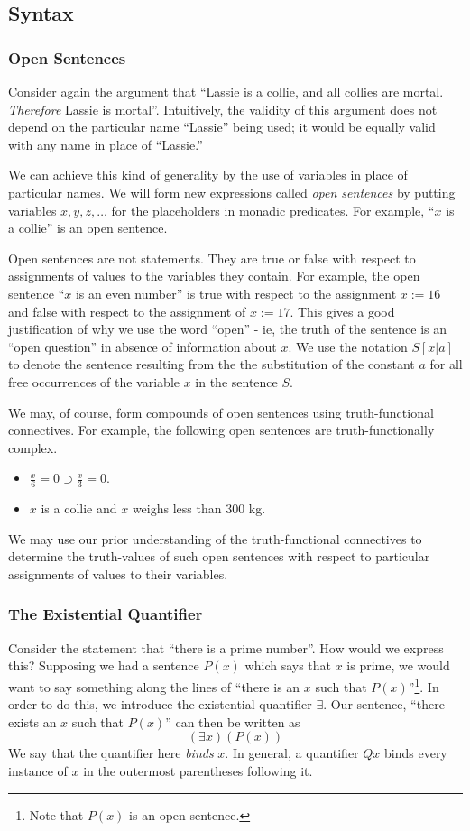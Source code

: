 \subsection{Syntax}

\subsubsection*{Open Sentences}
Consider again the argument that ``Lassie is a collie, and all collies are mortal. \emph{Therefore} Lassie is mortal''. Intuitively, the validity of this argument does not depend on the particular name ``Lassie'' being used; it would be equally valid with any name in place of ``Lassie.'' 

We can achieve this kind of generality by the use of variables in place of particular names. We will form new expressions called \emph{ open sentences} by putting variables $x,y,z,\dots$ for the placeholders in monadic predicates. For example, ``$x$ is a collie'' is an open sentence.

Open sentences are not statements. They are true or false with respect to assignments of values to the variables they contain. For example, the open sentence ``$x$ is an even number'' is true with respect to the assignment $x := 16$ and false with respect to the assignment of $x := 17$. This gives a good justification of why we use the word ``open'' - ie, the truth of the sentence is an ``open question'' in absence of information about $x$. We use the notation $S[x|a]$ to denote the sentence resulting from the the substitution of the constant $a$ for all free occurrences of the variable $x$ in the sentence $S$. 

We may, of course, form compounds of open sentences using truth-functional connectives. For example, the following open sentences are truth-functionally complex.
\begin{itemize}
\item $\frac{x}{6} = 0 \supset \frac{x}{3} = 0$.
\item $x$ is a collie and $x$ weighs less than 300 kg. 
\end{itemize}
We may use our prior understanding of the truth-functional connectives to determine the truth-values of such open sentences with respect to particular assignments of values to their variables.  



\subsubsection*{The Existential Quantifier}
Consider the statement that ``there is a prime number''. How would we express this? Supposing we had a sentence $P(x)$ which says that $x$ is prime, we would want to say something along the lines of ``there is an $x$ such that $P(x)$''\footnote{Note that $P(x)$ is an open sentence.}. In order to do this, we introduce the existential quantifier $\exists$. Our sentence, ``there exists an $x$ such that $P(x)$'' can then be written as 
\[
    (\exists x)(P(x))
\]
We say that the quantifier here \emph{binds} $x$. In general, a quantifier $Qx$ binds every instance of $x$ in the outermost parentheses following it. 

